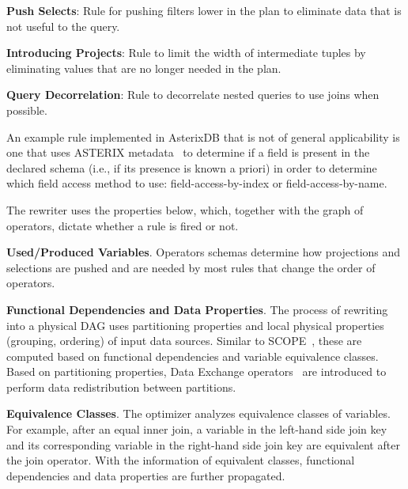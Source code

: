 \begin{asparaitem}
\item {\bf Push Selects}: Rule for pushing filters lower in the plan to eliminate data that is not useful to the query.
\item {\bf Introducing Projects}: Rule to limit the width of intermediate tuples by eliminating values that are no longer needed
in the plan.
\item {\bf Query Decorrelation}: Rule to decorrelate nested queries to use joins when possible.
\end{asparaitem}

An example rule implemented in AsterixDB that is not of general applicability is one that uses ASTERIX metadata~\cite{ASTERIX} to determine if a field is present in the declared schema (i.e., if its presence is known a priori) in order to determine which field access method to use: field-access-by-index or field-access-by-name.

The rewriter uses the properties below, which, together with the graph of operators, dictate whether a rule is fired or not.

\begin{list}{}{\leftmargin=1em}\itemsep 0pt \parskip 0pt
\item {\bf Used/Produced Variables}. Operators schemas determine how projections and selections
are pushed and are needed by most rules that change the order of operators.

\item {\bf Functional Dependencies and Data Properties}. The process of rewriting into a physical DAG uses partitioning properties and local physical properties (grouping, ordering) of input data sources. 
Similar to SCOPE~\cite{ScopeJournal}, these are computed based on functional dependencies and variable equivalence classes.
Based on partitioning properties, Data Exchange operators~\cite{Dewitt:1990fk,journals/tkde/Graefe94} are introduced
to perform data redistribution between partitions.

\item {\bf Equivalence Classes}. The optimizer analyzes equivalence classes of variables.
For example, after an equal inner join, a variable in the left-hand side join key
and its corresponding variable in the right-hand side join key are equivalent after the join operator. 
With the information of equivalent classes, functional dependencies and data properties are further propagated.
\end{list}

